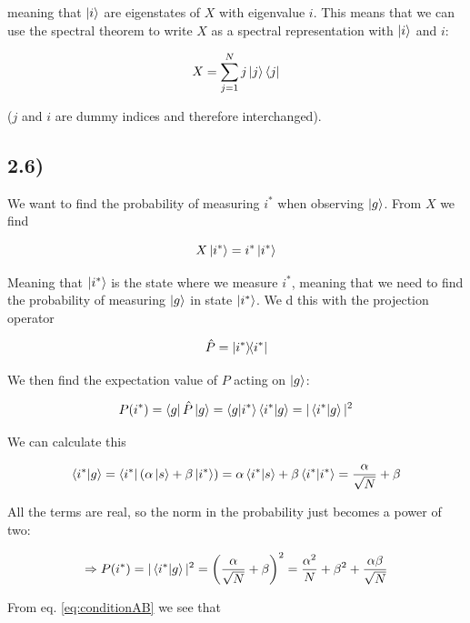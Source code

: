 \documentclass[a4paper,norsk, 10pt]{article}
\begin{document}
meaning that $\ket{i}$ are eigenstates of $X$ with eigenvalue $i$. This means that we can use the spectral theorem to write $X$ as a spectral representation with $\ket{i}$ and $i$:

\begin{equation}
X = \sum_{j=1}^N j\ket{j}\bra{j}
\end{equation}

($j$ and $i$ are dummy indices and therefore interchanged).

\subsection{2.6)}

We want to find the probability of measuring $i^*$ when observing $\ket{g}$. From $X$ we find

\begin{equation}
X\ket{i^*} = i^*\ket{i^*} 
\end{equation}

Meaning that $\ket{i^*}$ is the state where we measure $i^*$, meaning that we need to find the probability of measuring $\ket{g}$ in state $\ket{i^*}$. We d this with the projection operator

\begin{equation}
\hat{P} = \ketbra{i^*}{i^*}
\end{equation}

We then find the expectation value of $P$ acting on $\ket{g}$:

\begin{equation}
P(i^*) = \bra{g}\hat{P}\ket{g} = \bra{g}\ket{i^*}\bra{i^*}\ket{g} = |\braket{i^*}{g}|^2
\end{equation}

We can calculate this

\begin{equation}
\braket{i^*}{g} = \bra{i^*}(\alpha \ket{s} + \beta\ket{i^*}) = \alpha\braket{i^*}{s}+ \beta \braket{i^*}{i^*} = \frac{\alpha}{\sqrt{N}} + \beta
\end{equation}

All the terms are real, so the norm in the probability just becomes a power of two:

\begin{equation}
\Rightarrow P(i^*) = |\braket{i^*}{g}|^2 = \left(\frac{\alpha}{\sqrt{N}} + \beta\right)^2 = \frac{\alpha^2}{N} + \beta^2 + \frac{\alpha\beta}{\sqrt{N}}
\end{equation}

From eq. \eqref{eq:conditionAB} we see that
\end{document}
